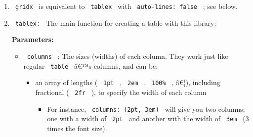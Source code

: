 \begin{enumerate}
\item
  \texttt{\ gridx\ } is equivalent to \texttt{\ tablex\ } with
  \texttt{\ auto-lines:\ false\ } ; see below.
\item
  \texttt{\ tablex:\ } The main function for creating a table with this
  library:

\begin{Shaded}
\begin{Highlighting}[]
\NormalTok{) = \{}
\NormalTok{\}}
\end{Highlighting}
\end{Shaded}

  \textbf{Parameters:}

  \begin{itemize}
  \item
    \texttt{\ columns\ } : The sizes (widths) of each column. They work
    just like regular \texttt{\ table\ } â€™s columns, and can be:

    \begin{itemize}
    \tightlist
    \item
      an array of lengths ( \texttt{\ 1pt\ } , \texttt{\ 2em\ } ,
      \texttt{\ 100\%\ } , â€¦), including fractional ( \texttt{\ 2fr\ }
      ), to specify the width of each column

      \begin{itemize}
      \tightlist
      \item
        For instance, \texttt{\ columns:\ (2pt,\ 3em)\ } will give you
        two columns: one with a width of \texttt{\ 2pt\ } and another
        with the width of \texttt{\ 3em\ } (3 times the font size).


\end{itemize}
\end{itemize}
\end{itemize}
\end{enumerate}
